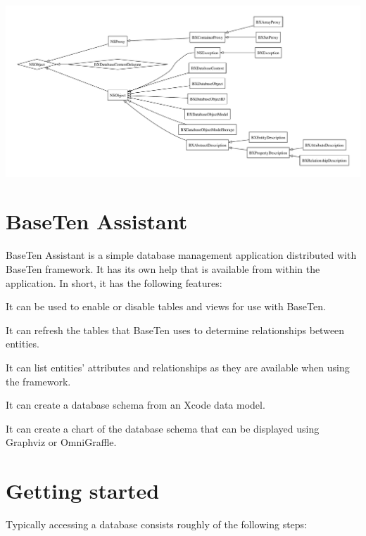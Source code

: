\begin{DoxyImage}
\includegraphics[width=\textwidth]{class-hierarchy}
\caption{Base\+Ten class hierarchy}
\end{DoxyImage}
 \hypertarget{baseten_assistant}{}\section{Base\+Ten Assistant}\label{baseten_assistant}
Base\+Ten Assistant is a simple database management application distributed with Base\+Ten framework. It has its own help that is available from within the application. In short, it has the following features\+: \begin{DoxyItemize}
\item It can be used to enable or disable tables and views for use with Base\+Ten. \item It can refresh the tables that Base\+Ten uses to determine relationships between entities. \item It can list entities' attributes and relationships as they are available when using the framework. \item It can create a database schema from an Xcode data model. \item It can create a chart of the database schema that can be displayed using Graphviz or Omni\+Graffle. \end{DoxyItemize}
\hypertarget{getting_started}{}\section{Getting started}\label{getting_started}
Typically accessing a database consists roughly of the following steps\+: 
